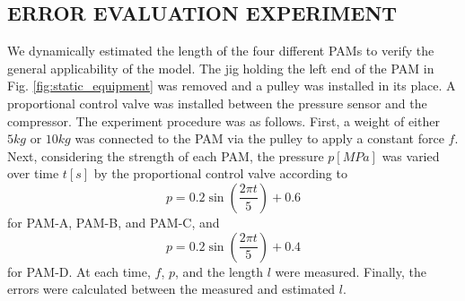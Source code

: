 \subsection{ERROR EVALUATION EXPERIMENT}
We dynamically estimated the length of the four different PAMs to verify the general applicability of the model.
The jig holding the left end of the PAM in Fig. \ref{fig:static_equipment} was removed and a pulley was installed in its place. A proportional control valve was installed between the pressure sensor and the compressor.
The experiment procedure was as follows. First, a weight of either $5\si{kg}$ or $10\si{kg}$ was connected to the PAM via the pulley to apply a constant force $f$. Next, considering the strength of each PAM, the pressure $p [\si{MPa}]$ was varied over time $t [\si{s}]$ by the proportional control valve according to 
\begin{equation}
p = 0.2 \sin\left(\frac{2 \pi t}{5}\right) + 0.6
\label{eq:Pref}
\end{equation}
for PAM-A, PAM-B, and PAM-C, and
\begin{equation}
p = 0.2 \sin\left(\frac{2 \pi t}{5}\right) + 0.4
\label{eq:Prefd}
\end{equation}
for PAM-D. At each time, $f$, $p$, and the length $l$ were measured. 
Finally, the errors were calculated between the measured and estimated $l$.


